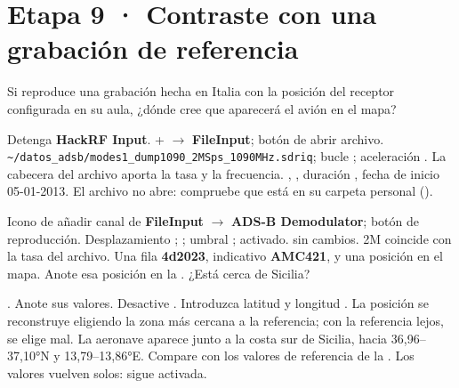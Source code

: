 \section{Etapa 9 · Contraste con una grabación de referencia}
\label{sec:u-offline}


\begin{prediccion}
Si reproduce una grabación hecha en Italia con la posición del receptor configurada en su aula, ¿dónde cree que aparecerá el avión en el mapa?
\end{prediccion}

{Detenga \textbf{HackRF Input}. + $\rightarrow$ \textbf{FileInput}; botón de abrir archivo.}
{\texttt{\textasciitilde/datos\_adsb/modes1\_dump1090\_2MSps\_1090MHz.sdriq}; bucle ; aceleración .}
{La cabecera del archivo aporta la tasa y la frecuencia.}
{, , duración , fecha de inicio 05-01-2013.}
{}
{El archivo no abre: compruebe que está en su carpeta personal ().}

{Icono de añadir canal de \textbf{FileInput} $\rightarrow$ \textbf{ADS-B Demodulator}; botón de reproducción.}
{Desplazamiento ;  ; umbral ;  activado.  sin cambios.}
{2M coincide con la tasa del archivo.}
{Una fila \textbf{4d2023}, indicativo \textbf{AMC421}, y una posición en el mapa.}
{Anote esa posición en la . ¿Está cerca de Sicilia?}
{}

{.}
{Anote sus valores. Desactive . Introduzca latitud  y longitud .}
{La posición se reconstruye eligiendo la zona más cercana a la referencia; con la referencia lejos, se elige mal.}
{La aeronave aparece junto a la costa sur de Sicilia, hacia 36,96--37,10°N y 13,79--13,86°E.}
{Compare con los valores de referencia de la .}
{Los valores vuelven solos:  sigue activada.}

